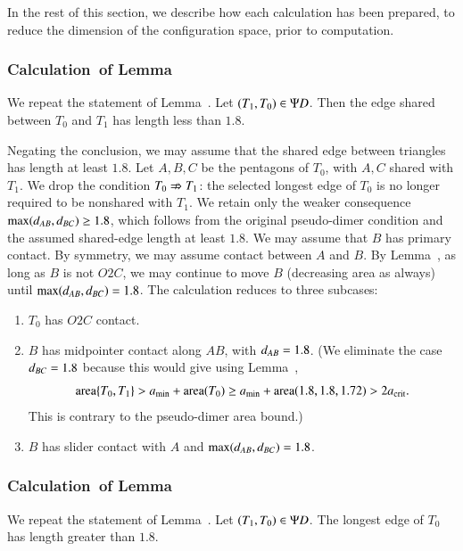 In the rest of this section, we describe how each calculation has been
prepared, to reduce the dimension of the configuration space, prior to
computation.

\subsubsection{Calculation~of Lemma~} 

We repeat the statement of Lemma~.  Let
$(T_1,T_0)\in \Psi D$.  Then the edge shared between $T_0$ and $T_1$ has
length less than $1.8$.  %

Negating the conclusion, we may assume that the shared edge between
triangles has length at least $1.8$.  Let $A,B,C$ be the pentagons of
$T_0$, with $A,C$ shared with $T_1$.  We drop the condition
$T_0\nRightarrow T_1$: the selected longest edge of $T_0$ is no longer
required to be nonshared with $T_1$.  We retain only the weaker
consequence $\max(d_{AB},d_{BC})\ge1.8$, which follows from
the original pseudo-dimer condition and the assumed shared-edge
length at least $1.8$.  We may assume that $B$ has primary contact. By symmetry, we may assume contact between $A$ and $B$.  By Lemma~, as
long as $B$ is not $O2C$, we may continue to move $B$ (decreasing area
as always) until $\max(d_{AB},d_{BC})=1.8$.  The calculation reduces
to three subcases:

\begin{enumerate}
\item $T_0$ has $O2C$ contact.
\item $B$ has midpointer contact along $AB$, with $d_{AB}=1.8$.  (We
  eliminate the case $d_{BC}=1.8$ because this would give using
  Lemma~,
\[
{\operatorname{area}}\{T_0,T_1\} > a_\text{min} + {\operatorname{area}}(T_0) \ge a_\text{min} + {\operatorname{area}}(1.8,1.8,1.72) > 2a_\text{crit}.
\]
This is contrary to the pseudo-dimer area bound.)
\item $B$ has slider contact with $A$ and $\max(d_{AB},d_{BC})=1.8$.
\end{enumerate}

\subsubsection{Calculation~of Lemma~} 

We repeat the statement of Lemma~.
Let $(T_1,T_0)\in \Psi D$.  The longest edge of $T_0$
has length greater than $1.8$. %

